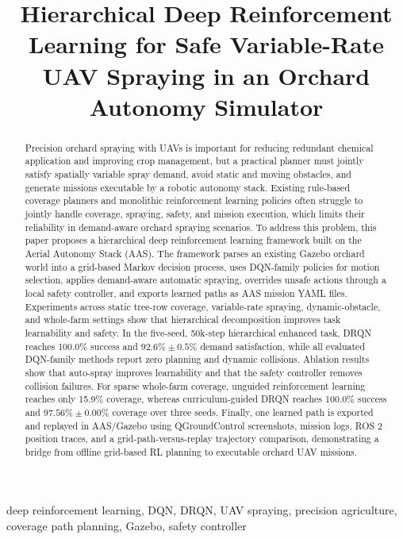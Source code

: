 \documentclass[conference,10pt]{IEEEtran}
\title{Hierarchical Deep Reinforcement Learning for Safe Variable-Rate UAV Spraying in an Orchard Autonomy Simulator}
\author{\IEEEauthorblockN{Anonymous Authors}
\IEEEauthorblockA{Paper under double-blind review}}
\begin{document}
\maketitle

\begin{abstract}
Precision orchard spraying with UAVs is important for reducing redundant chemical application and improving crop management, but a practical planner must jointly satisfy spatially variable spray demand, avoid static and moving obstacles, and generate missions executable by a robotic autonomy stack. Existing rule-based coverage planners and monolithic reinforcement learning policies often struggle to jointly handle coverage, spraying, safety, and mission execution, which limits their reliability in demand-aware orchard spraying scenarios. To address this problem, this paper proposes a hierarchical deep reinforcement learning framework built on the Aerial Autonomy Stack (AAS). The framework parses an existing Gazebo orchard world into a grid-based Markov decision process, uses DQN-family policies for motion selection, applies demand-aware automatic spraying, overrides unsafe actions through a local safety controller, and exports learned paths as AAS mission YAML files. Experiments across static tree-row coverage, variable-rate spraying, dynamic-obstacle, and whole-farm settings show that hierarchical decomposition improves task learnability and safety. In the five-seed, 50k-step hierarchical enhanced task, DRQN reaches 100.0\% success and $92.6\%\pm0.5\%$ demand satisfaction, while all evaluated DQN-family methods report zero planning and dynamic collisions. Ablation results show that auto-spray improves learnability and that the safety controller removes collision failures. For sparse whole-farm coverage, unguided reinforcement learning reaches only 15.9\% coverage, whereas curriculum-guided DRQN reaches 100.0\% success and $97.56\%\pm0.00\%$ coverage over three seeds. Finally, one learned path is exported and replayed in AAS/Gazebo using QGroundControl screenshots, mission logs, ROS 2 position traces, and a grid-path-versus-replay trajectory comparison, demonstrating a bridge from offline grid-based RL planning to executable orchard UAV missions.
\end{abstract}

\begin{IEEEkeywords}
deep reinforcement learning, DQN, DRQN, UAV spraying, precision agriculture, coverage path planning, Gazebo, safety controller
\end{IEEEkeywords}
\end{document}
